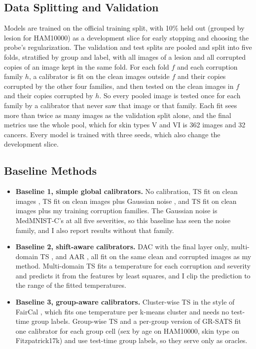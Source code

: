 \documentclass[sigconf,nonacm]{acmart}
\begin{document}
\subsection{Data Splitting and Validation}
\label{sec:splits}

Models are trained on the official training split, with 10\% held out (grouped by lesion for HAM10000) as a development slice for early stopping and choosing the probe's regularization. The validation and test splits are pooled and split into five folds, stratified by group and label, with all images of a lesion and all corrupted copies of an image kept in the same fold. For each fold $f$ and each corruption family $h$, a calibrator is fit on the clean images outside $f$ and their copies corrupted by the other four families, and then tested on the clean images in $f$ and their copies corrupted by $h$. So every pooled image is tested once for each family by a calibrator that never saw that image or that family. Each fit sees more than twice as many images as the validation split alone, and the final metrics use the whole pool, which for skin types V and VI is 362 images and 32 cancers. Every model is trained with three seeds, which also change the development slice.

\subsection{Baseline Methods}
\label{sec:baselines}

\begin{itemize}
  \item \textbf{Baseline 1, simple global calibrators.} No calibration, TS fit on clean images \cite{guo2017calibration}, TS fit on clean images plus Gaussian noise \cite{tomani2021posthoc}, and TS fit on clean images plus my training corruption families. The Gaussian noise is MedMNIST-C's at all five severities, so this baseline has seen the noise family, and I also report results without that family.
  \item \textbf{Baseline 2, shift-aware calibrators.} DAC \cite{tomani2023dac} with the final layer only, multi-domain TS \cite{yu2022multidomain}, and AAR \cite{yuksekgonul2023atypicality}, all fit on the same clean and corrupted images as my method. Multi-domain TS fits a temperature for each corruption and severity and predicts it from the features by least squares, and I clip the prediction to the range of the fitted temperatures.
  \item \textbf{Baseline 3, group-aware calibrators.} Cluster-wise TS in the style of FairCal \cite{salvador2022faircal}, which fits one temperature per k-means cluster and needs no test-time group labels. Group-wise TS and a per-group version of GR-SATS fit one calibrator for each group cell (sex by age on HAM10000, skin type on Fitzpatrick17k) and use test-time group labels, so they serve only as oracles.
\end{itemize}
\end{document}
